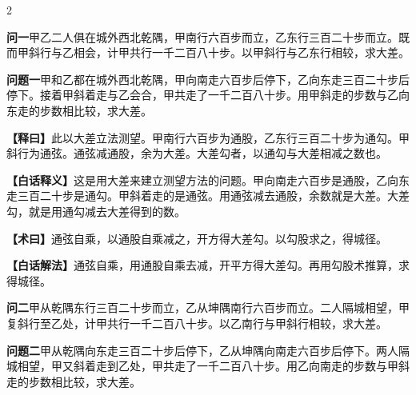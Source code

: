 \documentclass[11pt,a4paper]{article}
\newcommand{\WenQuestion}[1]{\textbf{\textcolor{classicalcolor}{#1}}}
\newcommand{\BaiQuestion}[1]{\textbf{\textcolor{moderncolor}{#1}}}
\newcommand{\WenExplain}{\textcolor{classicalcolor}{\textbf{【释曰】}}}
\newcommand{\BaiExplain}{\textcolor{moderncolor}{\textbf{【白话释义】}}}
\newcommand{\WenMethod}{\textcolor{classicalcolor}{\textbf{【术曰】}}}
\newcommand{\BaiMethod}{\textcolor{moderncolor}{\textbf{【白话解法】}}}
\begin{document}
\begin{paracol}{2}

\switchcolumn*
\begin{tcolorbox}[colback=red!3,colframe=red!30!black,boxrule=0.3pt]
\WenQuestion{问一}\quad 甲乙二人俱在城外西北乾隅，甲南行六百步而立，乙东行三百二十步而立。既而甲斜行与乙相会，计甲共行一千二百八十步。以甲斜行与乙东行相较，求大差。
\end{tcolorbox}
\switchcolumn
\begin{tcolorbox}[colback=blue!3,colframe=blue!30!black,boxrule=0.3pt]
\BaiQuestion{问题一}\quad 甲和乙都在城外西北乾隅，甲向南走六百步后停下，乙向东走三百二十步后停下。接着甲斜着走与乙会合，甲共走了一千二百八十步。用甲斜走的步数与乙向东走的步数相比较，求大差。
\end{tcolorbox}

\switchcolumn*
\begin{tcolorbox}[colback=red!5,colframe=red!30!black,boxrule=0.3pt]
\WenExplain\quad 此以大差立法测望。甲南行六百步为通股，乙东行三百二十步为通勾。甲斜行为通弦。通弦减通股，余为大差。大差勾者，以通勾与大差相减之数也。
\end{tcolorbox}
\switchcolumn
\begin{tcolorbox}[colback=blue!5,colframe=blue!30!black,boxrule=0.3pt]
\BaiExplain\quad 这是用大差来建立测望方法的问题。甲向南走六百步是通股，乙向东走三百二十步是通勾。甲斜着走的是通弦。用通弦减去通股，余数就是大差。大差勾，就是用通勾减去大差得到的数。
\end{tcolorbox}

\switchcolumn*
\begin{tcolorbox}[colback=red!5,colframe=red!40!black,boxrule=0.3pt]
\WenMethod\quad 通弦自乘，以通股自乘减之，开方得大差勾。以勾股求之，得城径。
\end{tcolorbox}
\switchcolumn
\begin{tcolorbox}[colback=blue!5,colframe=blue!40!black,boxrule=0.3pt]
\BaiMethod\quad 通弦自乘，用通股自乘去减，开平方得大差勾。再用勾股术推算，求得城径。
\end{tcolorbox}

\vspace{0.8em}

\switchcolumn*
\begin{tcolorbox}[colback=red!3,colframe=red!30!black,boxrule=0.3pt]
\WenQuestion{问二}\quad 甲从乾隅东行三百二十步而立，乙从坤隅南行六百步而立。二人隔城相望，甲复斜行至乙处，计甲共行一千二百八十步。以乙南行与甲斜行相较，求大差。
\end{tcolorbox}
\switchcolumn
\begin{tcolorbox}[colback=blue!3,colframe=blue!30!black,boxrule=0.3pt]
\BaiQuestion{问题二}\quad 甲从乾隅向东走三百二十步后停下，乙从坤隅向南走六百步后停下。两人隔城相望，甲又斜着走到乙处，甲共走了一千二百八十步。用乙向南走的步数与甲斜走的步数相比较，求大差。
\end{tcolorbox}


\end{paracol}
\end{document}
